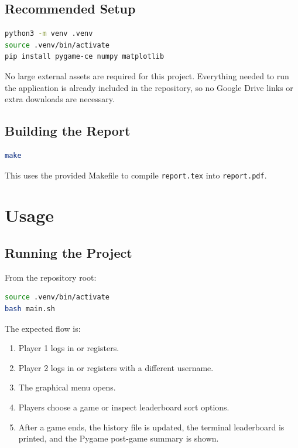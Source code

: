 \documentclass[12pt,a4paper]{article}
\begin{document}
\subsection{Recommended Setup}

\begin{lstlisting}[language=bash]
python3 -m venv .venv
source .venv/bin/activate
pip install pygame-ce numpy matplotlib
\end{lstlisting}

No large external assets are required for this project. Everything needed to run the application is already included in the repository, so no Google Drive links or extra downloads are necessary.

\subsection{Building the Report}

\begin{lstlisting}[language=bash]
make
\end{lstlisting}

This uses the provided Makefile to compile \texttt{report.tex} into \texttt{report.pdf}.

\section{Usage}

\subsection{Running the Project}

From the repository root:

\begin{lstlisting}[language=bash]
source .venv/bin/activate
bash main.sh
\end{lstlisting}

The expected flow is:

\begin{enumerate}[leftmargin=*]
    \item Player 1 logs in or registers.
    \item Player 2 logs in or registers with a different username.
    \item The graphical menu opens.
    \item Players choose a game or inspect leaderboard sort options.
    \item After a game ends, the history file is updated, the terminal leaderboard is printed, and the Pygame post-game summary is shown.
\end{enumerate}
\end{document}
